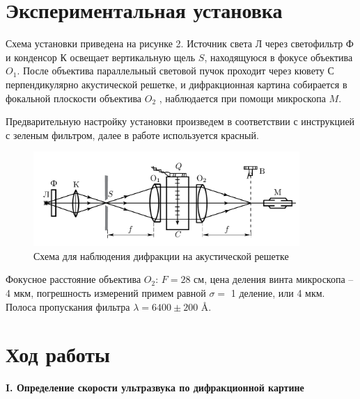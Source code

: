 \documentclass[a4paper,12pt]{article} %
\begin{document}
	\section*{Экспериментальная установка}
	
	Схема установки приведена на рисунке 2. Источник света Л через светофильтр Ф и конденсор К освещает вертикальную щель $ S $, находящуюся в фокусе объектива $ O_1 $. После объектива параллельный световой пучок проходит через кювету С перпендикулярно акустической решетке, и дифракционная картина собирается в фокальной плоскости объектива $ O_2 $ , наблюдается при помощи микроскопа $M$.
	
	Предварительную настройку установки произведем в соответствии с инструкцией с зеленым фильтром, далее в работе используется красный.
	
	\begin{figure}[h!]
		\centering	
		\includegraphics[width=0.9\textwidth]{Pictures/image_2}
		\caption{Схема для наблюдения дифракции на акустической решетке}
		\label{shema1}
	\end{figure}
	
	Фокусное расстояние объектива $ O_2$: $F = 28 $ см, цена деления винта микроскопа -- 4 мкм, погрешность измерений примем равной  $ \sigma = $ 1 деление, или 4 мкм. Полоса пропускания фильтра $ \lambda = 6400 \pm 200$ \AA.
	
	\newpage
	
	\section*{Ход работы}
	
	\begin{center}
		\textbf{I. Определение скорости ультразвука по дифракционной картине}
	\end{center}
\end{document}
